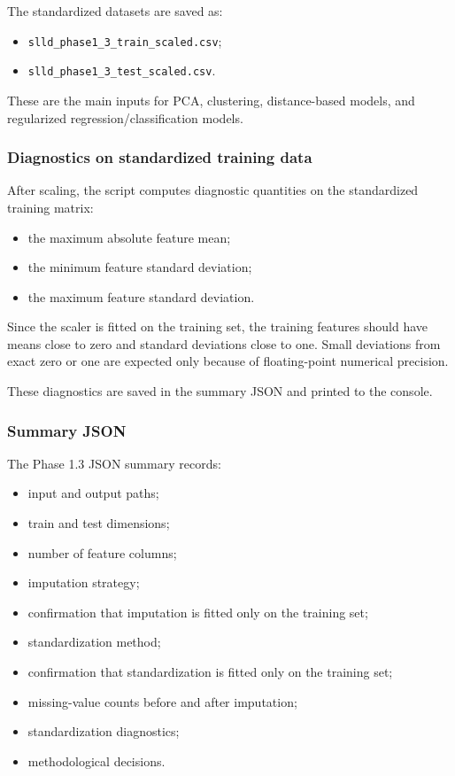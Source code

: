 \documentclass{ipgpmaster}
\begin{document}
The standardized datasets are saved as:

\begin{itemize}
    \item \texttt{slld\_phase1\_3\_train\_scaled.csv};
    \item \texttt{slld\_phase1\_3\_test\_scaled.csv}.
\end{itemize}

These are the main inputs for PCA, clustering, distance-based models, and regularized regression/classification models.

\subsubsection{Diagnostics on standardized training data}

After scaling, the script computes diagnostic quantities on the standardized training matrix:

\begin{itemize}
    \item the maximum absolute feature mean;
    \item the minimum feature standard deviation;
    \item the maximum feature standard deviation.
\end{itemize}

Since the scaler is fitted on the training set, the training features should have means close to zero and standard deviations close to one. Small deviations from exact zero or one are expected only because of floating-point numerical precision.

These diagnostics are saved in the summary JSON and printed to the console.

\subsubsection{Summary JSON}

The Phase 1.3 JSON summary records:

\begin{itemize}
    \item input and output paths;
    \item train and test dimensions;
    \item number of feature columns;
    \item imputation strategy;
    \item confirmation that imputation is fitted only on the training set;
    \item standardization method;
    \item confirmation that standardization is fitted only on the training set;
    \item missing-value counts before and after imputation;
    \item standardization diagnostics;
    \item methodological decisions.
\end{itemize}
\end{document}
